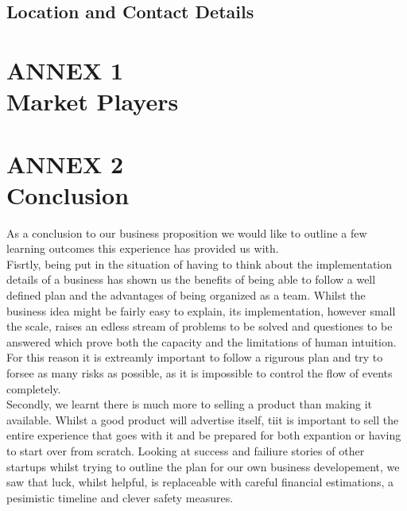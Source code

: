 \documentclass[11pt]{article}
\begin{document}
  \subsection{Location and Contact Details}

\newpage

\section{ANNEX 1 \\ Market Players}


\newpage


\section{ANNEX 2 \\ Conclusion}
As a conclusion to our business proposition we would like to outline a few learning outcomes this experience has provided us with.\\

\noindent Fisrtly, being put in the situation of having to think about the implementation details of a business has shown us the benefits of being able to follow a well defined plan and the advantages of being organized as a team. Whilst the business idea might be fairly easy to explain, its implementation, however small the scale, raises an edless stream of problems to be solved and questiones to be answered which prove both the capacity and the limitations of human intuition. For this reason it is extreamly important to follow a rigurous plan and try to forsee as many risks as possible, as it is impossible to control the flow of events completely. \\

\noindent Secondly, we learnt there is much more to selling a product than making it available. Whilst a good product will advertise itself, tiit is important to sell the entire experience that goes with it and be prepared for both expantion or having to start over from scratch. Looking at success and failiure stories of other startups whilst trying to outline the plan for our own business developement, we saw that luck, whilst helpful, is replaceable with careful financial estimations, a pesimistic timeline and clever safety measures. \\
\end{document}
